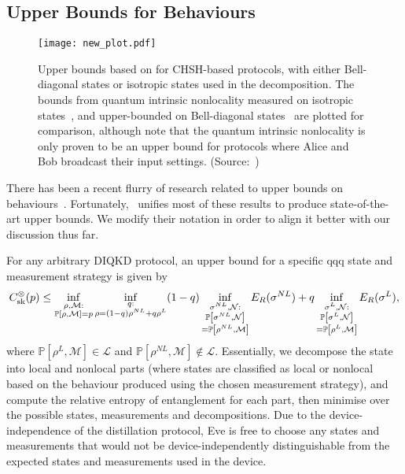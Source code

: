 \documentclass[10pt, a4paper]{article}
\numberwithin{equation}{section} %
\theoremstyle{definition}
\theoremstyle{plain}
\newcommand{\?}{\mathrel{?}} %
\newcommand{\sM}{\mathcal{M}}
\newcommand{\sN}{\mathcal{N}}
\newcommand{\Ls}{\mathcal{L}}
\newcommand{\behav}[2]{\mathbb{P}\left[#1, #2\right]}
\newcommand{\sk}{\rm sk}
\begin{document}
    \subsection{Upper Bounds for Behaviours}\label{sec:diqkd_ubehav}

    \begin{figure}
      \centering
      \texttt{[image: new\_plot.pdf]}
      \caption[Comparison of upper bounds for CHSH-based protocols.]{\label{fig:genubound} Upper bounds based on  for CHSH-based protocols, with either Bell-diagonal states or isotropic states used in the decomposition. The bounds from quantum intrinsic nonlocality measured on isotropic states~\cite{DIQKD_Limits}, and upper-bounded on Bell-diagonal states~\cite[Appendix B]{RevisedPeres} are plotted for comparison, although note that the quantum intrinsic nonlocality is only proven to be an upper bound for protocols where Alice and Bob broadcast their input settings. (Source:~\cite{CCSquashedEntangle})}
    \end{figure}

    There has been a recent flurry of research related to upper bounds on behaviours~\cite{NotSufficient, RevisedPeres, DIQKD_QKD_Gap, CCSquashedEntangle, DIQKD_Limits}. Fortunately,~\cite{CCSquashedEntangle} unifies most of these results to produce state-of-the-art upper bounds. We modify their notation in order to align it better with our discussion thus far.

    For any arbitrary DIQKD protocol, an upper bound for a specific qqq state and measurement strategy is given by~\cite[Thm. 3]{CCSquashedEntangle}
    \begin{equation}\label{eqn:genubound_state}
    C^{\otimes}_{\sk}(p) \leq \inf_{\substack{\rho,\sM : \\ \behav{\rho}{ \sM} = p}} \inf_{\substack{q : \\ \rho = (1-q)\rho^{NL} + q\rho^L}} (1-q) \inf_{\substack{\sigma^{NL}, \sN : \\ \behav{\sigma^{NL}}{ \sN} \\ = \behav{\rho^{NL}}{ \sM} }} E_R(\sigma^{NL}) + q \inf_{\substack{\sigma^L, \sN : \\ \behav{\sigma^L}{ \sN} \\ = \behav{\rho^L}{ \sM} }} E_R(\sigma^L),
    \end{equation}
  where \(\behav{\rho^L}{ \sM} \in \Ls\) and \(\behav{\rho^{NL}}{ \sM} \not\in \Ls\). Essentially, we decompose the state into local and nonlocal parts (where states are classified as local or nonlocal based on the behaviour produced using the chosen measurement strategy), and compute the relative entropy of entanglement for each part, then minimise over the possible states, measurements and decompositions. Due to the device-independence of the distillation protocol, Eve is free to choose any states and measurements that would not be device-independently distinguishable from the expected states and measurements used in the device.
\end{document}

